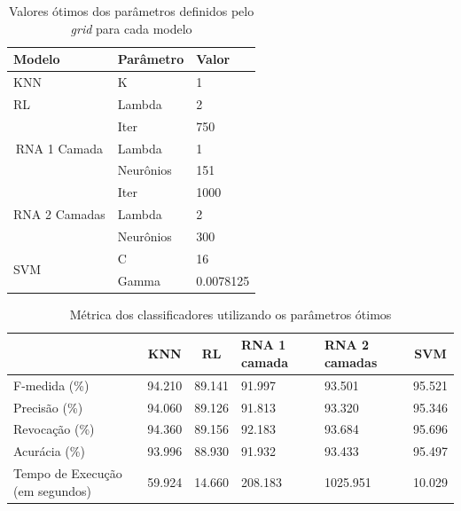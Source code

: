 \documentclass[10pt, conference, compsocconf]{IEEEtran}
\begin{document}
\begin{table}[]
\centering
\caption{Valores ótimos dos parâmetros definidos pelo \textit{grid} para cada modelo}
\label{parametros}
\begin{tabular}{|l|l|l|}
\hline
Modelo                                              & \multicolumn{1}{|l|}{Parâmetro} & Valor     \\ \hline
KNN                                                 & K                              & 1         \\ \hline
RL                                                  & Lambda                         & 2         \\ \hline
\multicolumn{1}{|c|}{\multirow{3}{*}{RNA 1 Camada}} & Iter                           & 750       \\
\multicolumn{1}{|c|}{}                              & Lambda                         & 1         \\
\multicolumn{1}{|c|}{}                              & Neurônios                      & 151       \\ \hline
\multirow{3}{*}{RNA 2 Camadas}                      & Iter                           & 1000      \\
                                                    & Lambda                         & 2         \\
                                                    & Neurônios                      & 300       \\ \hline
\multirow{2}{*}{SVM}                                & C
& 16        \\
                                                    & Gamma                          & 0.0078125 \\ \hline
\end{tabular}
\end{table}


\begin{table}[!t]
\renewcommand{\arraystretch}{1.3}
\caption{Métrica dos classificadores utilizando os parâmetros ótimos}
\label{metrica_otimos}
\centering
\begin{tabular}{|p{1.8cm}|c|c|p{1cm}|p{1cm}|c|}
\hline
    & KNN & RL & RNA 1 camada & RNA 2
    camadas & SVM\\
\hline
F-medida (\%) & 94.210 & 89.141 & 91.997 & 93.501 & 95.521 \\
Precisão (\%) & 94.060 & 89.126 & 91.813 & 93.320 & 95.346 \\
Revocação (\%) & 94.360 & 89.156 & 92.183 & 93.684 & 95.696 \\
Acurácia (\%) & 93.996 & 88.930 & 91.932 & 93.433 & 95.497 \\
Tempo de Execução (em segundos) & 59.924 & 14.660 & 208.183 & 1025.951 & 10.029 \\
\hline
\end{tabular}
\end{table}
\end{document}
